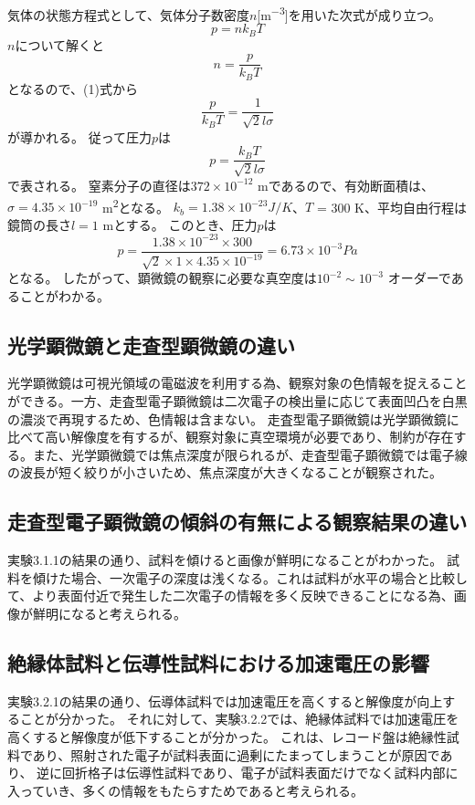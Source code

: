 \documentclass[a4paper,11pt]{jsarticle}
\begin{document}
気体の状態方程式として、気体分子数密度$n$[\si{m^{-3}}]を用いた次式が成り立つ。
\begin{equation}
  p = nk_BT
\end{equation}
$n$について解くと
\begin{equation}
  n = \frac{p}{k_BT}
\end{equation}
となるので、(1)式から
\begin{equation}
  \frac{p}{k_B T} = \frac{1}{\sqrt{2} l\sigma}
\end{equation}
が導かれる。
従って圧力$p$は
\begin{equation}
  p = \frac{k_B T}{\sqrt{2} l\sigma}
\end{equation}
で表される。
窒素分子の直径は$372\times 10^{-12}$ \si{m}であるので、有効断面積は、$\sigma = 4.35\times 10^{-19}$ \si{m^2}となる。
$k_b = 1.38\times 10^{-23} \si{J/K}$、$T$ = 300 \si{K}、平均自由行程は鏡筒の長さ$l = 1$ \si{m}とする。
このとき、圧力$p$は
\begin{equation}
  p = \frac{1.38\times 10^{-23} \times 300}{\sqrt{2} \times 1 \times 4.35\times 10^{-19}} = 6.73\times 10^{-3} \si{Pa}
\end{equation}
となる。
したがって、顕微鏡の観察に必要な真空度は$10^{-2}\sim 10^{-3}$ オーダーであることがわかる。
\subsection{光学顕微鏡と走査型顕微鏡の違い}
光学顕微鏡は可視光領域の電磁波を利用する為、観察対象の色情報を捉えることができる。一方、走査型電子顕微鏡は二次電子の検出量に応じて表面凹凸を白黒の濃淡で再現するため、色情報は含まない。
走査型電子顕微鏡は光学顕微鏡に比べて高い解像度を有するが、観察対象に真空環境が必要であり、制約が存在する。また、光学顕微鏡では焦点深度が限られるが、走査型電子顕微鏡では電子線の波長が短く絞りが小さいため、焦点深度が大きくなることが観察された。
\subsection{走査型電子顕微鏡の傾斜の有無による観察結果の違い}
実験3.1.1の結果の通り、試料を傾けると画像が鮮明になることがわかった。
試料を傾けた場合、一次電子の深度は浅くなる。これは試料が水平の場合と比較して、より表面付近で発生した二次電子の情報を多く反映できることになる為、画像が鮮明になると考えられる。
\subsection{絶縁体試料と伝導性試料における加速電圧の影響}
実験3.2.1の結果の通り、伝導体試料では加速電圧を高くすると解像度が向上することが分かった。
それに対して、実験3.2.2では、絶縁体試料では加速電圧を高くすると解像度が低下することが分かった。
これは、レコード盤は絶縁性試料であり、照射された電子が試料表面に過剰にたまってしまうことが原因であり、
逆に回折格子は伝導性試料であり、電子が試料表面だけでなく試料内部に入っていき、多くの情報をもたらすためであると考えられる。
\end{document}
